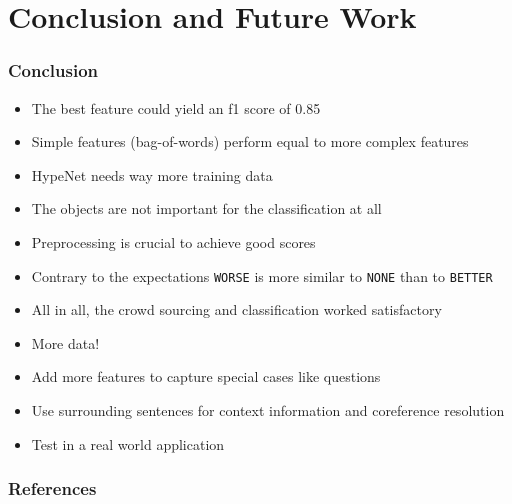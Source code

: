 \documentclass[11pt,aspectratio=169,usenames,dvipsnames]{beamer}
\begin{document}
    \section{Conclusion and Future Work}
    \frame{\sectionpage}
    \begin{frame}[t]
        \frametitle{Conclusion}
        \begin{itemize}
        \item The best feature could yield an f1 score of 0.85
        \item Simple features (bag-of-words) perform equal to more complex features
        \item HypeNet needs way more training data\pause
        \item The objects are not important for the classification at all
        \item Preprocessing is crucial to achieve good scores\pause
        \item Contrary to the expectations \texttt{WORSE} is more similar to \texttt{NONE} than to \texttt{BETTER}
        \item All in all, the crowd sourcing and classification worked satisfactory
        \end{itemize}
    \end{frame}
    
    \begin{frame}
        \begin{itemize}
        \frametitle{Future work}
    \item More data!
    \item Add more features to capture special cases like questions
    \item Use surrounding sentences for context information and coreference resolution
    \item Test in a real world application
    \end{itemize}
    \end{frame}



    \begin{frame}[allowframebreaks]
        \frametitle{References}
        
        
    \end{frame}
\end{document}
